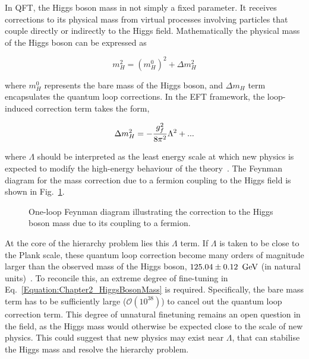 In QFT, the Higgs boson mass in not simply a fixed parameter. It receives corrections to its physical mass from virtual processes involving particles that couple directly or indirectly to the Higgs field. Mathematically the physical mass of the Higgs boson can be expressed as

\begin{equation}
    m_H^2 = (m_H^0)^2 + \Delta m_H^2
\label{Equation:Chapter2_HiggsBosonMass}
\end{equation}

where $m_H^0$ represents the bare mass of the Higgs boson, and $\Delta m_H$ term encapsulates the quantum loop corrections. In the EFT framework, the loop-induced correction term takes the form,

\begin{equation}
    \Delta m_H^2 = -\frac{g_f^2}{8\pi^2}\Lambda^2 + \space \text{...}
\end{equation}

where $\Lambda$ should be interpreted as the least energy scale at which new physics is expected to modify the high-energy behaviour of the theory~\cite{SUSY}. The Feynman diagram for the mass correction due to a fermion coupling to the Higgs field is shown in Fig.~\ref{Figure:Chapter2_Hierarchy_Feynman1}.

\begin{figure}[h]
\centering

\caption{One-loop Feynman diagram illustrating the correction to the Higgs boson mass due to its coupling to a fermion.}
\label{Figure:Chapter2_Hierarchy_Feynman1}
\end{figure}

At the core of the hierarchy problem lies this $\Lambda$ term. If $\Lambda$ is taken to be close to the Plank scale, these quantum loop correction become many orders of magnitude larger than the observed mass of the Higgs boson, $125.04 \pm 0.12~\,\text{Ge\hspace{-.08em}V}$ (in natural units)~\cite{Higgs_Mass_Z4L}. To reconcile this, an extreme degree of fine-tuning in Eq.~\ref{Equation:Chapter2_HiggsBosonMass} is required. Specifically, the bare mass term has to be sufficiently large ($\mathcal{O}(10^{38})$) to cancel out the quantum loop correction term. This degree of unnatural finetuning remains an open question in the field, as the Higgs mass would otherwise be expected close to the scale of new physics. This could suggest that new physics may exist near $\Lambda$, that can stabilise the Higgs mass and resolve the hierarchy problem. 

